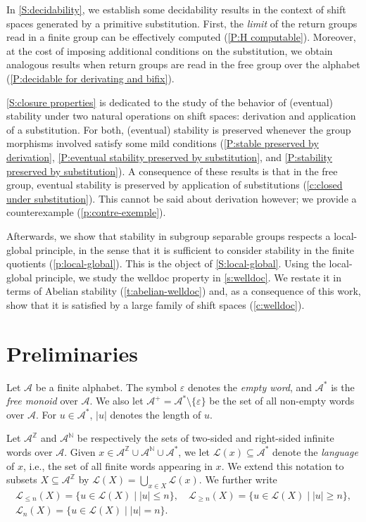 \documentclass{amsart}
\newcommand*{\nn}{\mathbb{N}}
\newcommand*{\zz}{\mathbb{Z}}
\newcommand*{\lang}{\mathcal{L}}
\newcommand*{\cA}{\mathcal{A}}
\theoremstyle{plain}
\theoremstyle{definition}
\theoremstyle{remark}
\begin{document}
In \cref{S:decidability}, we establish some decidability results in the context of shift spaces generated by a primitive substitution. First, the \emph{limit} of the return groups read in a finite group can be effectively computed (\cref{P:H computable}). Moreover, at the cost of imposing additional conditions on the substitution, we obtain analogous results when return groups are read in the free group over the alphabet (\cref{P:decidable for derivating and bifix}).

\cref{S:closure properties} is dedicated to the study of the behavior of (eventual) stability under two natural operations on shift spaces: derivation and application of a substitution. For both, (eventual) stability is preserved whenever the group morphisms involved satisfy some mild conditions (\cref{P:stable preserved by derivation}, \cref{P:eventual stability preserved by substitution}, and \cref{P:stability preserved by substitution}). A consequence of these results is that in the free group, eventual stability is preserved by application of substitutions (\cref{c:closed under substitution}). This cannot be said about derivation however; we provide a counterexample (\cref{p:contre-exemple}). 

Afterwards, we show that stability in subgroup separable groups respects a local-global principle, in the sense that it is sufficient to consider stability in the finite quotients (\cref{p:local-global}). This is the object of \cref{S:local-global}. Using the local-global principle, we study the welldoc property in \cref{s:welldoc}. We restate it in terms of Abelian stability (\cref{t:abelian-welldoc}) and, as a consequence of this work, show that it is satisfied by a large family of shift spaces (\cref{c:welldoc}).

\section{Preliminaries}
\label{s:pre}

Let $\cA$ be a finite alphabet. The symbol $\varepsilon$ denotes the \emph{empty word}, and $\cA^*$ is the \emph{free monoid} over $\cA$. We also let $\cA^+ = \cA^*\setminus\{\varepsilon\}$ be the set of all non-empty words over $\cA$. For $u \in \cA^*$, $|u|$ denotes the length of $u$.

Let $\cA^\zz$ and $\cA^\nn$ be respectively the sets of two-sided and right-sided infinite words over $\cA$. Given $x\in\cA^\zz\cup\cA^\nn\cup\cA^*$, we let $\lang(x)\subseteq\cA^*$ denote the \emph{language} of $x$, i.e., the set of all finite words appearing in $x$. We extend this notation to subsets $X\subseteq \cA^\zz$ by $\lang(X) = \bigcup_{x\in X}\lang(x)$. We further write
\begin{gather*}
    \lang_{\le n}(X) = \{ u \in \lang(X) \mid |u| \le n \},\quad \lang_{\ge n}(X) = \{ u \in \lang(X) \mid |u| \ge n \},\\ \lang_n(X) = \{ u \in \lang(X) \mid |u| = n \}.
\end{gather*}
\end{document}
